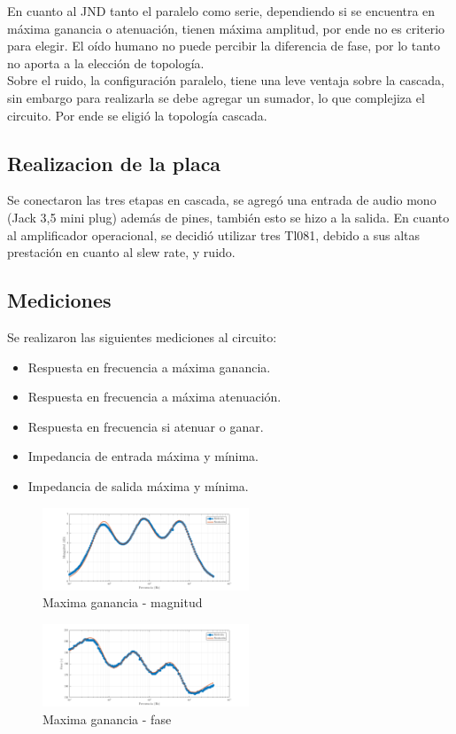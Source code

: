 \documentclass[../../tc_tp3_main.tex]{subfiles}
\begin{document}
En cuanto al JND tanto el paralelo como  serie, dependiendo si se encuentra en máxima ganancia o atenuación, tienen máxima amplitud, por ende no es criterio para elegir. El oído humano no puede percibir la diferencia de fase, por lo tanto no aporta a la elección de topología.
\\Sobre el ruido, la configuración paralelo, tiene una leve ventaja sobre la cascada, sin embargo para realizarla se debe agregar un sumador, lo que complejiza el circuito. Por ende se eligió la topología cascada.

\subsection{Realizacion de la placa}

Se conectaron las tres etapas en cascada, se agregó una entrada de audio mono (Jack 3,5 mini plug) además de pines, también esto se hizo a la salida. En cuanto al amplificador operacional, se decidió utilizar tres Tl081, debido a sus altas prestación en cuanto al slew rate, y ruido.

\subsection{Mediciones}
Se realizaron las siguientes mediciones al circuito:
\begin{itemize}
 \item Respuesta en frecuencia a máxima ganancia.
 \item Respuesta en frecuencia a máxima atenuación.
 \item Respuesta en frecuencia si atenuar o ganar.
 \item Impedancia de entrada máxima y mínima.
 \item Impedancia de salida máxima y mínima.
\end{itemize}

\begin{figure}[H]
\centering
\includegraphics[width=0.55\textwidth]{imagenes/max_m.png}
\caption{Maxima ganancia - magnitud} 
\end{figure}

\begin{figure}[H]
\centering
\includegraphics[width=0.55\textwidth]{imagenes/max_f.png}
\caption{Maxima ganancia - fase} 
\end{figure}
\end{document}

